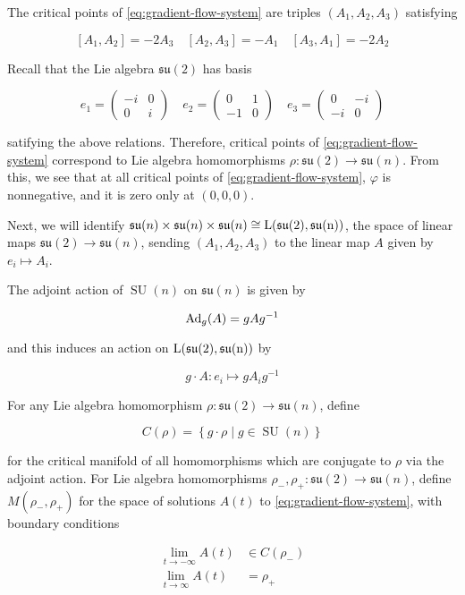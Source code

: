 \documentclass{report}
\DeclareMathOperator{\SU}{SU}
\newcommand{\su}{\mathfrak{su}}
\begin{document}
The critical points of \cref{eq:gradient-flow-system} are triples \((A_1, A_2, A_3)\) satisfying

\[[A_1, A_2] = -2A_3 \quad [A_2, A_3] = -A_1 \quad [A_3, A_1] = -2A_2\]

Recall that the Lie algebra \(\su(2)\) has basis

\[e_1 = \begin{pmatrix}
    -i & 0 \\
    0 & i
\end{pmatrix} \quad e_2 = \begin{pmatrix}
    0 & 1 \\
    -1 & 0
\end{pmatrix} \quad e_3 = \begin{pmatrix}
    0 & -i \\
    -i & 0
\end{pmatrix}\]

satifying the above relations. Therefore, critical points of \cref{eq:gradient-flow-system} correspond to Lie algebra homomorphisms \(\rho : \su(2) \to \su(n)\). From this, we see that at all critical points of \cref{eq:gradient-flow-system}, \(\varphi\) is nonnegative, and it is zero only at \((0, 0, 0)\).

Next, we will identify \(\su(n) \times \su(n) \times \su(n) \cong \rm L(\su(2), \su(n))\), the space of linear maps \(\su(2) \to \su(n)\), sending \((A_1, A_2, A_3)\) to the linear map \(A\) given by \(e_i \mapsto A_i\).

The adjoint action of \(\SU(n)\) on \(\su(n)\) is given by

\[\operatorname{Ad}_g(A) = gAg^{-1}\]

and this induces an action on \(\rm L(\su(2), \su(n))\) by

\[g \cdot A : e_i \mapsto gA_ig^{-1}\]

For any Lie algebra homomorphism \(\rho : \su(2) \to \su(n)\), define

\[C(\rho) = \left\{g \cdot \rho \mid g \in \SU(n)\right\}\]

for the critical manifold of all homomorphisms which are conjugate to \(\rho\) via the adjoint action. For Lie algebra homomorphisms \(\rho_-, \rho_+ : \su(2) \to \su(n)\), define \(M(\rho_-, \rho_+)\) for the space of solutions \(A(t)\) to \cref{eq:gradient-flow-system}, with boundary conditions

\begin{equation}
    \label{eq:boundary-conditions}
    \begin{split}
        \lim_{t\to-\infty}A(t) &\in C(\rho_-) \\
        \lim_{t\to\infty}A(t) &= \rho_+
    \end{split}
\end{equation}
\end{document}
